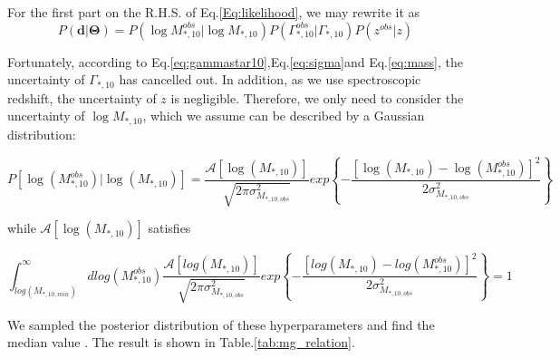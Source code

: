 \documentclass[fleqn,usenatbib]{mnras}
\begin{document}
\par For the first part on the R.H.S. of Eq.\ref{Eq:likelihood}, we may rewrite it as
\begin{equation}
    P(\mathbf{d}|\mathbf{\Theta}) = P(\log M^{obs}_{*,10}|\log M_{*,10})P(\Gamma^{obs}_{*,10}|\Gamma_{*,10})P(z^{obs}|z)
\end{equation}
\par Fortunately, according to Eq.\ref{eq:gammastar10},Eq.\ref{eq:sigma}and Eq.\ref{eq:mass}, the uncertainty of $\Gamma_{*,10}$ has cancelled out. In addition, as we use spectroscopic redshift, the uncertainty of $z$ is negligible. Therefore, we only need to consider the uncertainty of $\log M_{*,10}$, which we assume can be described by a Gaussian distribution:
\begin{tiny}
    \begin{equation}
        P[\log (M_{*,10}^{obs})|\log (M_{*,10})] = \frac{\mathcal{A}[\log (M_{*,10})]}{\sqrt{2\pi\sigma^2_{M_{*,10,obs}}}}exp\left\{-\frac{[\log (M_{*,10}) - \log (M_{*,10}^{obs})]^2}{2\sigma_{M_{*,10, obs}}^2}\right\}
    \end{equation}
\end{tiny}
while $\mathcal{A}[\log (M_{*,10})]$ satisfies
\begin{tiny}
    \begin{equation}
        \int_{log(M_{*,10,min})}^\infty dlog(M_{*,10}^{obs})\frac{\mathcal{A}[log(M_{*,10})]}{\sqrt{2\pi\sigma^2_{M_{*,10,obs}}}}exp\left\{-\frac{[log(M_{*,10}) - log(M_{*,10}^{obs})]^2}{2\sigma_{M_{*,10, obs}}^2}\right\} = 1 
    \end{equation}
\end{tiny}
\par We sampled the posterior distribution of these hyperparameters and find the median value . The result is shown in Table.\ref{tab:mg_relation}. 
\begin{table}
    \renewcommand\arraystretch{1.5}
    \centering
    \caption{Beyesian hierarchical model fitting for the $\Gamma_{*,10} - M_{*,10}$ relation in different redshift bins.}
    \label{tab:mg_relation}
\end{table}
\end{document}

